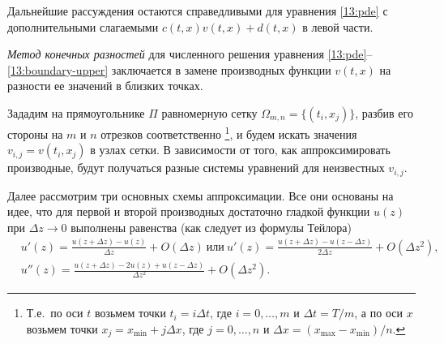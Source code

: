 \begin{remark}
Дальнейшие рассуждения остаются справедливыми для уравнения \eqref{13:pde} с дополнительными слагаемыми $c(t,x)v(t,x) + d(t,x)$ в левой части.
\end{remark}

\emph{Метод конечных разностей} для численного решения уравнения \eqref{13:pde}--\eqref{13:boundary-upper} заключается в замене производных функции $v(t,x)$ на разности ее значений в близких точках.

Зададим на прямоугольнике $\Pi$ равномерную сетку $\Omega_{m,n} = \{(t_i, x_j)\}$, разбив его стороны на $m$ и $n$ отрезков соответственно%
\footnote{Т.е.\ по оси $t$ возьмем точки $t_i = i \Delta t$, где $i=0,\dots,m$ и $\Delta t = T/m$, а по оси $x$ возьмем точки $x_j = x_\text{min} + j \Delta x$, где $j = 0,\ldots,n$ и $\Delta x = (x_\text{max} - x_\text{min})/n$.}, и будем искать значения $v_{i,j} = v(t_i, x_j)$ в узлах сетки.
В зависимости от того, как аппроксимировать производные, будут получаться разные системы уравнений для неизвестных $v_{i,j}$.

Далее рассмотрим три основных схемы аппроксимации.
Все они основаны на идее, что для первой и второй производных достаточно гладкой функции $u(z)$ при $\Delta z \to 0$ выполнены равенства (как следует из  формулы Тейлора)
\begin{align*}
&u'(z) = \frac{u(z + \Delta z) - u(z)}{\Delta z} + O(\Delta z)\ \text{или}\ 
u'(z) = \frac{u(z + \Delta z) - u(z - \Delta z)}{2\Delta z} + O(\Delta z^2),\\
&u''(z) = \frac{u(z + \Delta z) - 2u(z) + u(z - \Delta z)}{\Delta z^2} + O(\Delta z^2).
\end{align*}


